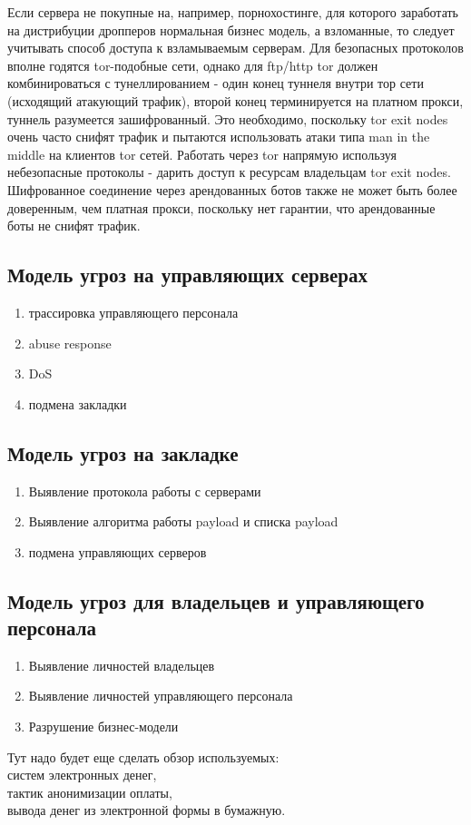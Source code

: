 Если сервера не покупные на, например, порнохостинге, для которого заработать на дистрибуции дропперов нормальная бизнес модель, а взломанные, то следует учитывать способ доступа к взламываемым серверам. Для
безопасных протоколов вполне годятся tor-подобные сети, однако для ftp/http tor должен комбинироваться
с тунеллированием - один конец туннеля внутри тор сети (исходящий атакующий трафик), второй конец
терминируется на платном прокси, туннель разумеется зашифрованный. Это необходимо, поскольку tor exit nodes
очень часто снифят трафик и пытаются использовать атаки типа man in the middle на клиентов tor сетей.
Работать через tor напрямую используя небезопасные протоколы - дарить доступ к ресурсам владельцам tor exit nodes.
Шифрованное соединение через арендованных ботов также не может быть более доверенным, чем платная прокси,
поскольку нет гарантии, что арендованные боты не снифят трафик.

\subsection{Модель угроз на управляющих серверах}
\label{CC_treat_model}
\begin{enumerate}
\item{трассировка управляющего персонала}
\item{abuse response}
\item{DoS}
\item{подмена закладки}
\end{enumerate}

\subsection{Модель угроз на закладке}
\label{bot_treat_model}
\begin{enumerate}
\item{Выявление протокола работы с серверами}
\item{Выявление алгоритма работы payload и списка payload}
\item{подмена управляющих серверов}
\end{enumerate}

\subsection{Модель угроз для владельцев и управляющего персонала}

\begin{enumerate}
\item{Выявление личностей владельцев}
\item{Выявление личностей управляющего персонала}
\item{Разрушение бизнес-модели}
\end{enumerate}

Тут надо будет еще сделать обзор используемых:\\
 систем электронных денег,\\
 тактик анонимизации оплаты,\\
 вывода денег из электронной формы в бумажную.\\
